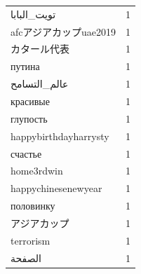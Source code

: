 \begin{tabular}{lr}
تويت\_البابا & 1 \\
afcアジアカップuae2019 & 1 \\
カタール代表 & 1 \\
путина & 1 \\
عالم\_التسامح & 1 \\
красивые & 1 \\
глупость & 1 \\
happybirthdayharrysty & 1 \\
счастье & 1 \\
home3rdwin & 1 \\
happychinesenewyear & 1 \\
половинку & 1 \\
アジアカップ & 1 \\
terrorism & 1 \\
الصفحة & 1 \\
\bottomrule
\end{tabular}
